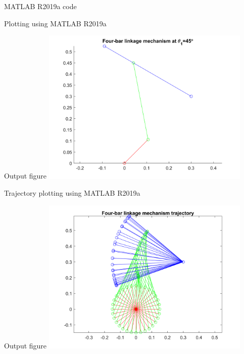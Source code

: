 \begin{frame}{MATLAB R2019a code}

\end{frame}
\begin{frame}

\end{frame}
\begin{frame}{Plotting using MATLAB R2019a}

\end{frame}
\begin{frame}{Output figure}
\centering
\includegraphics[width=100mm]{images/RRRR-plot.png}
\end{frame}
\begin{frame}{Trajectory plotting using MATLAB R2019a}

\end{frame}
\begin{frame}{Output figure}
\centering
\includegraphics[width=100mm]{images/RRRR-trajectory.png}
\end{frame}